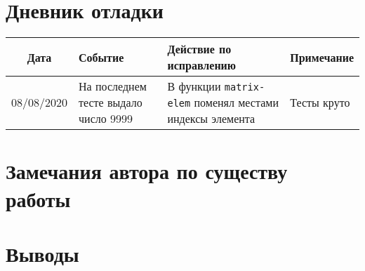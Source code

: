 \documentclass[12pt]{article}
\begin{document}
\section{Дневник отладки}
\noindent
\begin{tabularx}{\linewidth}{|c|X|X|X|}
\hline
Дата & Событие & Действие по исправлению & Примечание \\
\hline
08/08/2020 & На последнем тесте выдало число 9999 & В функции {\tt matrix-elem} поменял местами индексы элемента & Тесты круто \\
\hline
\end{tabularx}

\section{Замечания автора по существу работы}

\section{Выводы}
\end{document}
